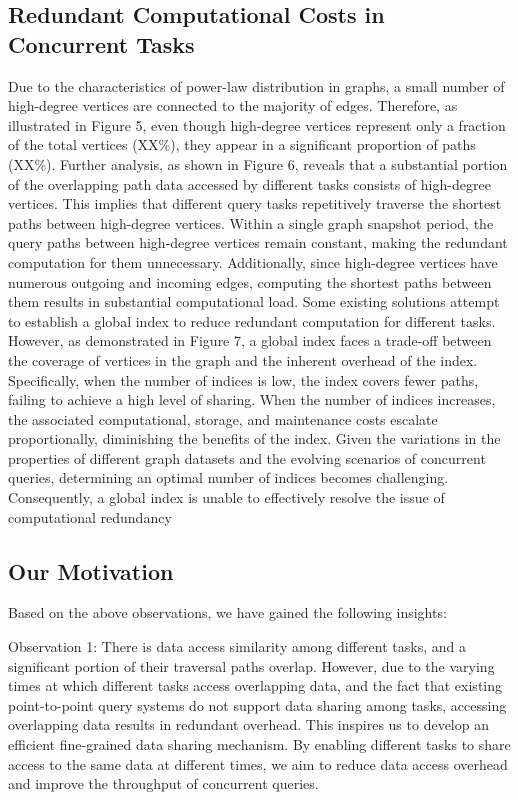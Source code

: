 \documentclass[lettersize,journal]{IEEEtran} %
\begin{document}
\subsection{Redundant Computational Costs in Concurrent Tasks}
Due to the characteristics of power-law distribution in graphs, a small number of high-degree vertices are connected to the majority of edges. Therefore, as illustrated in Figure 5, even though high-degree vertices represent only a fraction of the total vertices (XX\%), they appear in a significant proportion of paths (XX\%). Further analysis, as shown in Figure 6, reveals that a substantial portion of the overlapping path data accessed by different tasks consists of high-degree vertices. This implies that different query tasks repetitively traverse the shortest paths between high-degree vertices. Within a single graph snapshot period, the query paths between high-degree vertices remain constant, making the redundant computation for them unnecessary. Additionally, since high-degree vertices have numerous outgoing and incoming edges, computing the shortest paths between them results in substantial computational load. Some existing solutions attempt to establish a global index to reduce redundant computation for different tasks. However, as demonstrated in Figure 7, a global index faces a trade-off between the coverage of vertices in the graph and the inherent overhead of the index. Specifically, when the number of indices is low, the index covers fewer paths, failing to achieve a high level of sharing. When the number of indices increases, the associated computational, storage, and maintenance costs escalate proportionally, diminishing the benefits of the index. Given the variations in the properties of different graph datasets and the evolving scenarios of concurrent queries, determining an optimal number of indices becomes challenging. Consequently, a global index is unable to effectively resolve the issue of computational redundancy

\subsection{Our Motivation}
Based on the above observations, we have gained the following insights:

Observation 1: There is data access similarity among different tasks, and a significant portion of their traversal paths overlap. However, due to the varying times at which different tasks access overlapping data, and the fact that existing point-to-point query systems do not support data sharing among tasks, accessing overlapping data results in redundant overhead. This inspires us to develop an efficient fine-grained data sharing mechanism. By enabling different tasks to share access to the same data at different times, we aim to reduce data access overhead and improve the throughput of concurrent queries.
\end{document}
